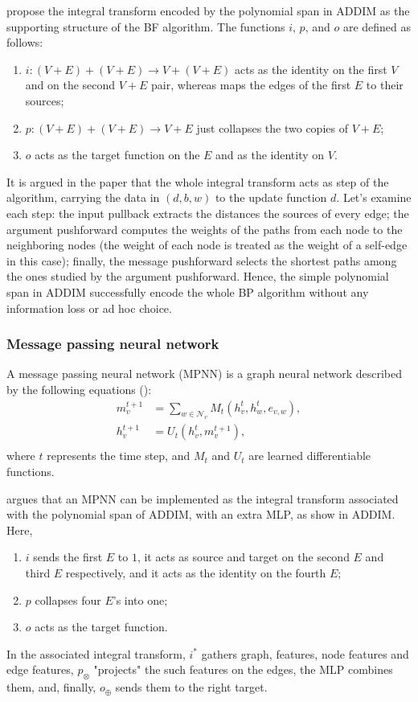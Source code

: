 \documentclass[11pt,a4paper,openright,twoside]{report}
\theoremstyle{plain}
\theoremstyle{definition}
\begin{document}
\cite{dudzik2022graph} propose the integral transform encoded by the polynomial span in ADDIM as the supporting structure of the BF algorithm. The functions $i$, $p$, and $o$ are defined as follows:
\begin{enumerate}
  \item $i: (V + E) + (V + E) \to V + (V + E)$ acts as the identity on the first $V$ and on the second $V + E$ pair, whereas maps the edges of the first $E$ to their sources;
  \item $p: (V + E) + (V + E) \to V + E$ just collapses the two copies of $V + E$;
  \item $o$ acts as the target function on the $E$ and as the identity on $V$.
\end{enumerate}
It is argued in the paper that the whole integral transform acts as step of the algorithm, carrying the data in $(d, b, w)$ to the update function $d$. Let's examine each step: the input pullback extracts the distances the sources of every edge; the argument pushforward computes the weights of the paths from each node to the neighboring nodes (the weight of each node is treated as the weight of a self-edge in this case); finally, the message pushforward selects the shortest paths among the ones studied by the argument pushforward. 
Hence, the simple polynomial span in ADDIM successfully encode the whole BP algorithm without any information loss or ad hoc choice. 

\subsubsection{Message passing neural network}

A message passing neural network (MPNN) is a graph neural network described by the following equations (\cite{pmlr-v70-gilmer17a}):
\begin{align*}
  m_v^{t+1} &= \sum_{w \in \mathcal{N}_v}M_t(h_v^t,h_w^t,e_{v,w}),\\
  h_v^{t+1} &= U_t(h_v^t,m_v^{t+1}),\\
\end{align*}
where $t$ represents the time step, and $M_t$ and $U_t$ are learned differentiable functions.


\cite{dudzik2022graph} argues that an MPNN can be implemented as the integral transform associated with the polynomial span of ADDIM, with an extra MLP, as show in ADDIM. Here,
\begin{enumerate}
  \item $i$ sends the first $E$ to $1$, it acts as source and target on the second $E$ and third $E$ respectively, and it acts as the identity on the fourth $E$;
  \item $p$ collapses four $E$'s into one;
  \item $o$ acts as the target function.
\end{enumerate}
In the associated integral transform, $i^*$ gathers graph, features, node features and edge features, $p_{\otimes}$ "projects" the such features on the edges, the MLP combines them, and, finally, $o_{\oplus}$ sends them to the right target.
\end{document}
